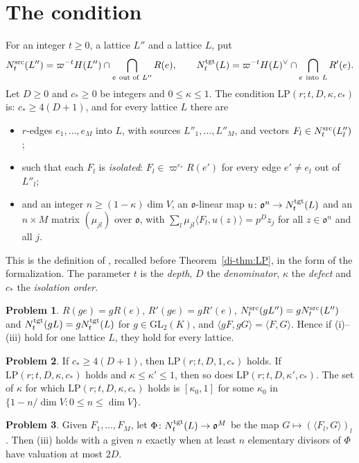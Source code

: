 \documentclass[reqno]{amsart}
\theoremstyle{definition}
\newtheorem{problem}{Problem}[section]
\theoremstyle{plain}
\theoremstyle{remark}
\newcommand{\GL}{\mathrm{GL}}
\newcommand{\LP}{\mathrm{LP}}
\newcommand{\Nsrc}{N^{\rm src}}
\newcommand{\Ntgt}{N^{\rm tgt}}
\newcommand{\vo}{\mathfrak o}
\begin{document}
\section{The condition}\label{sec:LP}

For an integer \(t\ge0\), a lattice \(L''\) and a lattice \(L\), put
\[
 \Nsrc_t(L'')=\varpi^{-t}H(L'')\cap\bigcap_{e\ \text{out of}\ L''}R(e),\qquad
 \Ntgt_t(L)=\varpi^{-t}H(L)^\vee\cap\bigcap_{e\ \text{into}\ L}R'(e).
\]
Let \(D\ge0\) and \(c_*\ge0\) be integers and \(0\le\kappa\le1\).  The condition \(\LP(r;t,D,\kappa,c_*)\) is: \(c_*\ge4(D+1)\), and for every lattice \(L\) there are
\begin{itemize}
\item[(i)] \(r\)-edges \(e_1,\dots,e_M\) into \(L\), with sources \(L''_1,\dots,L''_M\), and vectors \(F_l\in\Nsrc_t(L''_l)\);
\item[(ii)] such that each \(F_l\) is \emph{isolated}: \(F_l\in\varpi^{c_*}R(e')\) for every edge \(e'\ne e_l\) out of \(L''_l\);
\item[(iii)] and an integer \(n\ge(1-\kappa)\dim V\), an \(\vo\)-linear map \(u\colon\vo^n\to\Ntgt_t(L)\) and an \(n\times M\) matrix \((\mu_{jl})\) over \(\vo\), with \(\sum_l\mu_{jl}\langle F_l,u(z)\rangle=p^Dz_j\) for all \(z\in\vo^n\) and all \(j\).
\end{itemize}
This is the definition of \cite[Def.~12.6]{Adr}, recalled before Theorem~\ref{di-thm:LP}, in the form of the formalization.  The parameter \(t\) is the \emph{depth}, \(D\) the \emph{denominator}, \(\kappa\) the \emph{defect} and \(c_*\) the \emph{isolation order}.

\begin{problem}\label{pr:one-lattice}
\(R(ge)=gR(e)\), \(R'(ge)=gR'(e)\), \(\Nsrc_t(gL'')=g\Nsrc_t(L'')\) and \(\Ntgt_t(gL)=g\Ntgt_t(L)\) for \(g\in\GL_2(K)\), and \(\langle gF,gG\rangle=\langle F,G\rangle\).  Hence if (i)--(iii) hold for one lattice \(L\), they hold for every lattice.
\end{problem}

\begin{problem}\label{pr:trivial-defect}
If \(c_*\ge4(D+1)\), then \(\LP(r;t,D,1,c_*)\) holds.  If \(\LP(r;t,D,\kappa,c_*)\) holds and \(\kappa\le\kappa'\le1\), then so does \(\LP(r;t,D,\kappa',c_*)\).  The set of \(\kappa\) for which \(\LP(r;t,D,\kappa,c_*)\) holds is \([\kappa_0,1]\) for some \(\kappa_0\) in \(\{1-n/\dim V:0\le n\le\dim V\}\).
\end{problem}

\begin{problem}\label{pr:smith}
Given \(F_1,\dots,F_M\), let \(\Phi\colon\Ntgt_t(L)\to\vo^M\) be the map \(G\mapsto(\langle F_l,G\rangle)_l\).  Then (iii) holds with a given \(n\) exactly when at least \(n\) elementary divisors of \(\Phi\) have valuation at most \(2D\).
\end{problem}
\end{document}
